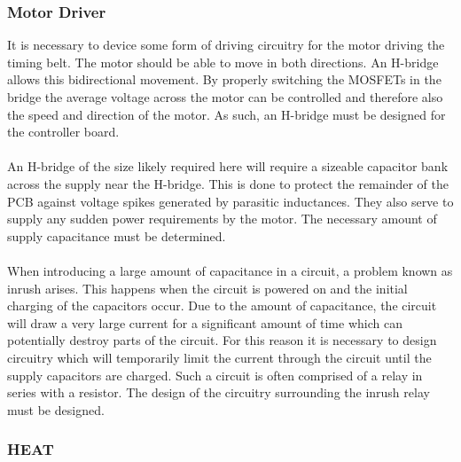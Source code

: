 \subsubsection{Motor Driver}
It is necessary to device some form of driving circuitry for the motor driving the timing belt.
The motor should be able to move in both directions. 
An H-bridge allows this bidirectional movement.
By properly switching the MOSFETs in the bridge the average voltage across the motor can be controlled and therefore also the speed and direction of the motor.
As such, an H-bridge must be designed for the controller board.
\\~\\
An H-bridge of the size likely required here will require a sizeable capacitor bank across the supply near the H-bridge.
This is done to protect the remainder of the PCB against voltage spikes generated by parasitic inductances. 
They also serve to supply any sudden power requirements by the motor.
The necessary amount of supply capacitance must be determined.
\\~\\
When introducing a large amount of capacitance in a circuit, a problem known as inrush arises.
This happens when the circuit is powered on and the initial charging of the capacitors occur.
Due to the amount of capacitance, the circuit will draw a very large current for a significant amount of time which can potentially destroy parts of the circuit.
For this reason it is necessary to design circuitry which will temporarily limit the current through the circuit until the supply capacitors are charged.
Such a circuit is often comprised of a relay in series with a resistor.
The design of the circuitry surrounding the inrush relay must be designed.

\subsubsection{HEAT}

